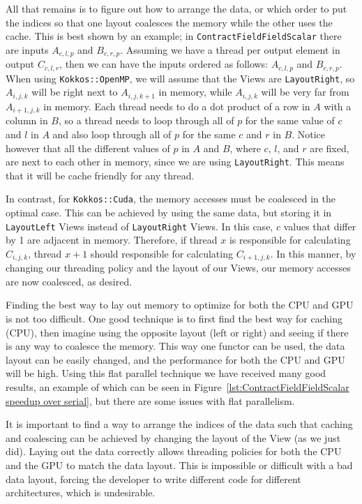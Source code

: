 All that remains is to figure out how to arrange the data, or which order to put
the indices so that one layout coalesces the memory while the other uses the
cache. This is best shown by an example; in \texttt{ContractFieldFieldScalar}
there are inputs $A_{c, l, p}$ and $B_{c, r, p}$. Assuming we have a thread per
output element in output $C_{c, l, r}$, then we can have the inputs ordered as
follows: $A_{c, l, p}$ and $B_{c, r, p}$. When using \texttt{Kokkos::OpenMP}, we
will assume that the Views are \texttt{LayoutRight}, so $A_{i, j, k}$ will be
right next to $A_{i, j, k+1}$ in memory, while $A_{i, j, k}$ will be very far
from $A_{i+1, j, k}$ in memory. Each thread needs to do a dot product of a row
in $A$ with a column in $B$, so a thread needs to loop through all of $p$ for
the same value of $c$ and $l$ in $A$ and also loop through all of $p$ for the
same $c$ and $r$ in $B$. Notice however that all the different values of $p$ in
$A$ and $B$, where $c$, $l$, and $r$ are fixed, are next to each other in
memory, since we are using \texttt{LayoutRight}. This means that it will be
cache friendly for any thread. 

In contrast, for \texttt{Kokkos::Cuda}, the memory accesses must be coalesced in
the optimal case.  This can be achieved by using the same data, but storing it
in \texttt{LayoutLeft} Views instead of \texttt{LayoutRight} Views. In this
case, $c$ values that differ by 1 are adjacent in memory.  Therefore, if thread
$x$ is responsible for calculating $C_{i, j, k}$, thread $x+1$ should
responsible for calculating $C_{i+1, j, k}$. In this manner, by changing our
threading policy and the layout of our Views, our memory accesses are now
coalesced, as desired. 

Finding the best way to lay out memory to optimize for both the CPU and GPU is
not too difficult. One good technique is to first find the best way for caching (CPU),
then imagine using the opposite layout (left or right) and seeing if there is
any way to coalesce the memory. This way one functor can be used, the data
layout can be easily changed, and the performance for both the CPU and GPU will
be high. Using this flat parallel technique we have received many good results,
an example of which can be seen in Figure~\ref{lst:ContractFieldFieldScalar
speedup over serial}, but there are some issues with flat parallelism.

It is important to find a way to arrange the indices of the data such that
caching and coalescing can be achieved by changing the layout of the View (as we
just did).  Laying out the data correctly allows threading policies for both the
CPU and the GPU to match the data layout.  This is impossible or difficult with
a bad data layout, forcing the developer to write different code for
different architectures, which is undesirable.

